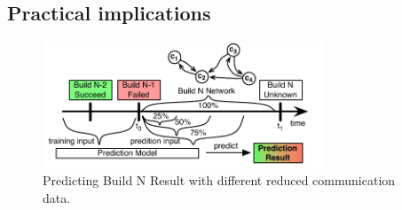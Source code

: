 \subsection{Practical implications}
\label{subsec:practicalimpl}

\begin{figure}[t]
\begin{center}
\includegraphics[width=8.4cm]{figures/ReducedCommunicationInput}
\caption{Predicting Build N Result with different reduced communication
data.}
\label{fig:ReducedCommunicationInput}
\end{center}
\end{figure}




